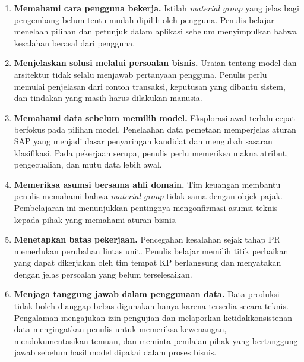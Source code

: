 \begin{enumerate}
    \item \textbf{Memahami cara pengguna bekerja.} Istilah \textit{material group} yang jelas bagi pengembang belum tentu mudah dipilih oleh pengguna. Penulis belajar menelaah pilihan dan petunjuk dalam aplikasi sebelum menyimpulkan bahwa kesalahan berasal dari pengguna.

    \item \textbf{Menjelaskan solusi melalui persoalan bisnis.} Uraian tentang model dan arsitektur tidak selalu menjawab pertanyaan pengguna. Penulis perlu memulai penjelasan dari contoh transaksi, keputusan yang dibantu sistem, dan tindakan yang masih harus dilakukan manusia.

    \item \textbf{Memahami data sebelum memilih model.} Eksplorasi awal terlalu cepat berfokus pada pilihan model. Penelaahan data pemetaan memperjelas aturan SAP yang menjadi dasar penyaringan kandidat dan mengubah sasaran klasifikasi. Pada pekerjaan serupa, penulis perlu memeriksa makna atribut, pengecualian, dan mutu data lebih awal.

    \item \textbf{Memeriksa asumsi bersama ahli domain.} Tim keuangan membantu penulis memahami bahwa \textit{material group} tidak sama dengan objek pajak. Pembelajaran ini menunjukkan pentingnya mengonfirmasi asumsi teknis kepada pihak yang memahami aturan bisnis.

    \item \textbf{Menetapkan batas pekerjaan.} Pencegahan kesalahan sejak tahap PR memerlukan perubahan lintas unit. Penulis belajar memilih titik perbaikan yang dapat dikerjakan oleh tim tempat KP berlangsung dan menyatakan dengan jelas persoalan yang belum terselesaikan.

    \item \textbf{Menjaga tanggung jawab dalam penggunaan data.} Data produksi tidak boleh dianggap bebas digunakan hanya karena tersedia secara teknis. Pengalaman mengajukan izin pengujian dan melaporkan ketidakkonsistenan data mengingatkan penulis untuk memeriksa kewenangan, mendokumentasikan temuan, dan meminta penilaian pihak yang bertanggung jawab sebelum hasil model dipakai dalam proses bisnis.

\end{enumerate}


